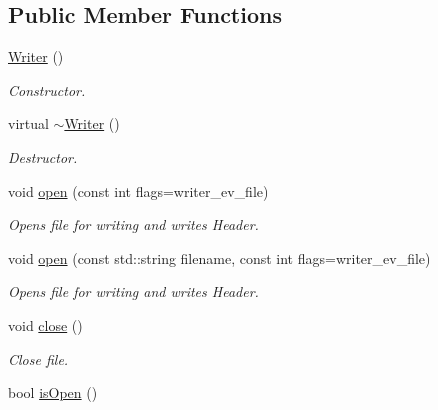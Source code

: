 \subsection*{Public Member Functions}
\begin{DoxyCompactItemize}
\item 
\hypertarget{classgdf_1_1_writer_a612e93a7862d4fa9c871a7e62399048c}{
\hyperlink{classgdf_1_1_writer_a612e93a7862d4fa9c871a7e62399048c}{Writer} ()}
\label{classgdf_1_1_writer_a612e93a7862d4fa9c871a7e62399048c}

\begin{DoxyCompactList}\small\item\em Constructor. \item\end{DoxyCompactList}\item 
\hypertarget{classgdf_1_1_writer_a6a436f443584c4daa94a941e2f202dfc}{
virtual \hyperlink{classgdf_1_1_writer_a6a436f443584c4daa94a941e2f202dfc}{$\sim$Writer} ()}
\label{classgdf_1_1_writer_a6a436f443584c4daa94a941e2f202dfc}

\begin{DoxyCompactList}\small\item\em Destructor. \item\end{DoxyCompactList}\item 
void \hyperlink{classgdf_1_1_writer_a984bb670f2ca17c85916924877edab39}{open} (const int flags=writer\_\-ev\_\-file)
\begin{DoxyCompactList}\small\item\em Opens file for writing and writes Header. \item\end{DoxyCompactList}\item 
void \hyperlink{classgdf_1_1_writer_ab493c0c6beb99d11d0cba1a229681e44}{open} (const std::string filename, const int flags=writer\_\-ev\_\-file)
\begin{DoxyCompactList}\small\item\em Opens file for writing and writes Header. \item\end{DoxyCompactList}\item 
void \hyperlink{classgdf_1_1_writer_ae5856d4b6ca98e7af552d99d830433c9}{close} ()
\begin{DoxyCompactList}\small\item\em Close file. \item\end{DoxyCompactList}\item 
\hypertarget{classgdf_1_1_writer_abc4c99004fc2275bc25dddb95e164e10}{
bool \hyperlink{classgdf_1_1_writer_abc4c99004fc2275bc25dddb95e164e10}{isOpen} ()}
\label{classgdf_1_1_writer_abc4c99004fc2275bc25dddb95e164e10}


\end{DoxyCompactItemize}

